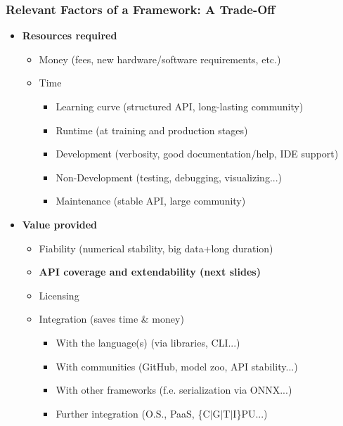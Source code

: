 \documentclass[hyperref={pdfpagelabels=false}]{beamer}
\begin{document}
     
      \begin{frame}
        \frametitle{Relevant Factors of a Framework: A Trade-Off}
        \begin{itemize}[<.->]
          \vspace{1mm}
       \item  \textbf{Resources required}
         \begin{itemize}[<.->]
         \item Money (fees, new hardware/software requirements, etc.)
         \item Time
           \begin{itemize}[<.->]
           \item Learning curve (structured API, long-lasting community)
           \item Runtime (at training and production stages)
           \item Development (verbosity, good documentation/help, IDE support)
           \item Non-Development (testing, debugging, visualizing...)
           \item Maintenance (stable API, large community)
           \end{itemize}
         \end{itemize}
         \vspace{4mm}
       \item \textbf{Value provided}
         \begin{itemize}[<.->]
         \item Fiability (numerical stability, big data+long duration)
         \item \textbf{API coverage and extendability (next slides)}
         \item Licensing
         \item Integration (saves time \& money)
           \begin{itemize}[<.->]
           \item With the language(s) (via libraries, CLI...)
           \item With communities (GitHub, model zoo, API stability...)
           \item With other frameworks (f.e. serialization via ONNX...)
           \item Further integration (O.S., PaaS, \{C$\mid$G$\mid$T$\mid$I\}PU...)
           \end{itemize}
         \end{itemize}
        \end{itemize}
        \vspace{4mm}
     \end{frame}
\end{document}
